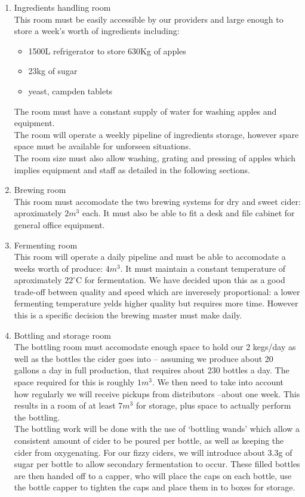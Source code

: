 \documentclass[11pt]{article}
\begin{document}
  \begin{enumerate}
  \item Ingredients handling room \\
  This room must be easily accessible by our providers and large enough to store a week's worth of ingredients including:
    \begin{itemize}
    \item 1500L refrigerator to store 630Kg of apples
    \item 23kg of sugar
    \item yeast, campden tablets
    \end{itemize}
  The room must have a constant supply of water for washing apples and equipment. \\
  The room will operate a weekly pipeline of ingredients storage, however spare space must be available for unforseen situations.\\
  The room size must also allow washing, grating and pressing of apples which implies equipment and staff as detailed in the following sections.

  \item Brewing room \\
  This room must accomodate the two brewing systems for dry and sweet cider: aproximately $2m^3$ each. It must also be able to fit a desk and file cabinet for general office equipment.
  \item Fermenting room \\
  This room will operate a daily pipeline and must be able to accomodate a weeks worth of produce: $4m^3$. It must maintain a constant temperature of aproximately $22^\circ$C for fermentation. We have decided upon this as a good trade-off between quality and speed which are inveresely proportional: a lower fermenting temperature yelds higher quality but requires more time. However this is a specific decision the brewing master must make daily.

  \item Bottling and storage room \\
The bottling room must accomodate enough space to hold our 2 kegs/day as well as the bottles the cider goes into -- assuming we produce about 20 gallons a day in full production, that requires about 230 bottles a day. The space required for this is roughly $1m^3$. We then need to take into account how regularly we will receive pickups from distributors --about one week. This results in a room of at least $7m^3$ for storage, plus space to actually perform the bottling. \\
The bottling work will be done with the use of `bottling wands' which allow a consistent amount of cider to be poured per bottle, as well as keeping the cider from oxygenating. For our fizzy ciders, we will introduce about 3.3g of sugar per bottle to allow secondary fermentation to occur. These filled bottles are then handed off to a capper, who will place the caps on each bottle, use the bottle capper to tighten the caps and place them in to boxes for storage.


\end{enumerate}
\end{document}
